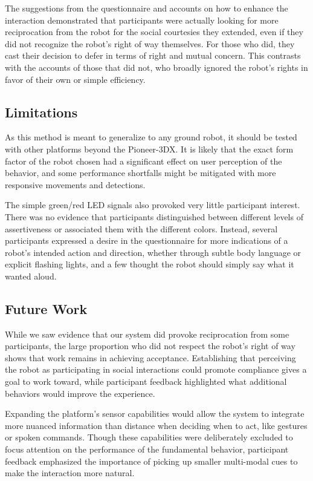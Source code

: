 \documentclass[letterpaper, 10 pt, conference]{ieeeconf}  %
\begin{document}
The suggestions from the questionnaire and accounts on how to enhance the interaction demonstrated that participants were actually looking for more reciprocation from the robot for the social courtesies they extended, even if they did not recognize the robot's right of way themselves. For those who did, they cast their decision to defer in terms of right and mutual concern. This contrasts with the accounts of those that did not, who broadly ignored the robot's rights in favor of their own or simple efficiency.

\subsection{Limitations}

As this method is meant to generalize to any ground robot, it should be tested with other platforms beyond the Pioneer-3DX. It is likely that the exact form factor of the robot chosen had a significant effect on user perception of the behavior, and some performance shortfalls might be mitigated with more responsive movements and detections. 

The simple green/red LED signals also provoked very little participant interest. There was no evidence that participants distinguished between different levels of assertiveness or associated them with the different colors. Instead, several participants expressed a desire in the questionnaire for more indications of a robot’s intended action and direction, whether through subtle body language or explicit flashing lights, and a few thought the robot should simply say what it wanted aloud. 

\subsection{Future Work}

While we saw evidence that our system did provoke reciprocation from some participants, the large proportion who did not respect the robot's right of way shows that work remains in achieving acceptance. Establishing that perceiving the robot as participating in social interactions could promote compliance gives a goal to work toward, while participant feedback highlighted what additional behaviors would improve the experience.

Expanding the platform’s sensor capabilities would allow the system to integrate more nuanced information than distance when deciding when to act, like gestures or spoken commands. Though these capabilities were deliberately excluded to focus attention on the performance of the fundamental behavior, participant feedback emphasized the importance of picking up smaller multi-modal cues to make the interaction more natural.
\end{document}
